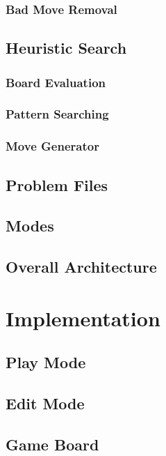 \documentclass{l4proj}
\begin{document}
\subsection{Bad Move Removal}

\section{Heuristic Search}
\subsection{Board Evaluation}
\subsection{Pattern Searching}
\subsection{Move Generator}

\section{Problem Files}

\section{Modes}

\section{Overall Architecture}









\chapter{Implementation}

\section{Play Mode}

\section{Edit Mode}

\section{Game Board}
\end{document}

